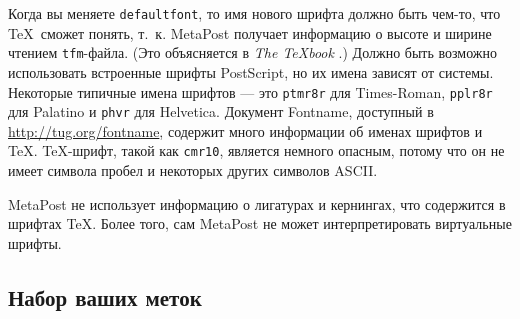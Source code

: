 \documentclass{article} %
\def\ttt{\texttt}  %
\begin{document}
\label{fontname}
Когда вы меняете {\tt defaultfont}, то имя нового шрифта должно быть 
чем-то, что \TeX\ сможет понять, т.~к. MetaPost получает информацию о 
высоте и ширине чтением 
{\tt tfm}-файла.
(Это объясняется в {\sl The \TeX book\/} \cite{kn:a}.)
Должно быть возможно использовать встроенные шрифты 
PostScript, но их имена зависят от системы.
Некоторые типичные имена шрифтов --- это {\tt ptmr8r} для 
Times-Roman, \ttt{pplr8r} для Palatino 
и \ttt{phvr} для Helvetica. 
Документ Fontname, доступный в 
\url{http://tug.org/fontname}, содержит много информации об именах шрифтов 
и \TeX. 
\TeX{}-шрифт, такой как {\tt cmr10}, является немного 
опасным, потому что он не имеет символа пробел и некоторых других символов 
ASCII.

MetaPost не использует информацию о лигатурах и 
кернингах, что содержится в шрифтах \TeX.
Более того, сам MetaPost не может интерпретировать виртуальные шрифты.

\subsection{Набор ваших меток}
\end{document}
